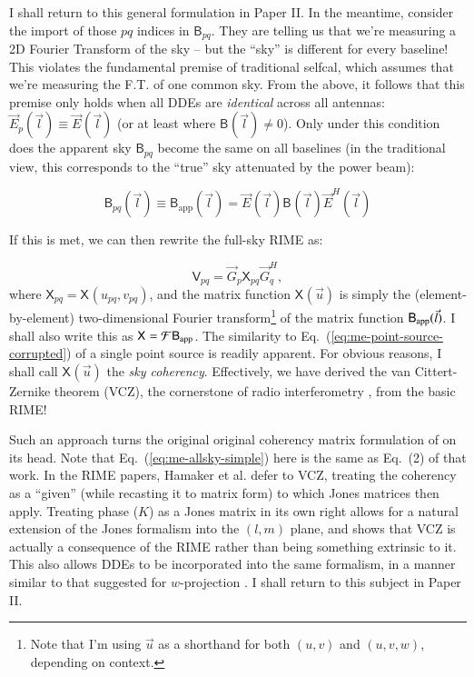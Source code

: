 \documentclass[referee]{aa}
\newcommand{\herm}{H}
\newcommand{\jones}[2]{\vec {#1}_{#2}}
\newcommand{\jonesT}[2]{\vec {#1}^{\herm}_{#2}}
\newcommand{\coh}[2]{\mathsf{{#1}}_{{#2}}}
\begin{document}
I shall return to this general formulation in Paper II. In the meantime, consider the import of those $pq$ indices in $\coh{B}{pq}$. They are telling us that we're measuring a 2D Fourier Transform of the sky -- but the ``sky'' is different for every baseline! This violates the fundamental premise of traditional selfcal, which assumes that we're measuring the F.T. of one common sky. From the above, it follows that this premise only holds when all DDEs are \emph{identical} across all antennas: $\jones{E}{p}(\vec l) \equiv \jones{E}{}(\vec l)$ (or at least where $\coh{B}{}(\vec l) \ne 0$). Only under this condition does the apparent sky $\coh{B}{pq}$ become the same on all baselines (in the traditional view, this corresponds to the ``true'' sky attenuated by the power beam):

\[
\coh{B}{pq}(\vec l) \equiv \coh{B}{\mathrm{app}}(\vec l) =  \jones{E}{}(\vec l) \coh{B}{}(\vec l) \jonesT{E}{}(\vec l)
\]

If this is met, we can then rewrite the full-sky RIME as:

\begin{equation}\label{eq:me-allsky-simple}
\coh{V}{pq} = \jones{G}{p} \coh{X}{pq} \jonesT{G}{q},
\end{equation}
where $\coh{X}{pq} = \coh{X}{}(u_{pq},v_{pq})$, and the matrix function $\coh{X}{}(\vec u)$ is simply the (element-by-element) two-dimensional Fourier transform\footnote{Note that I'm using $\vec u$ as a shorthand for both $(u,v)$ and $(u,v,w)$, depending on context.}
of the matrix function $\coh{B}{\rm app}(\vec l)$. I shall also write this as $\coh{X}{}={\cal F}\coh{B}{\mathrm{app}}$. The similarity to Eq.~(\ref{eq:me-point-source-corrupted}) of a single point source is readily apparent. For obvious reasons, I shall call $\coh{X}{}(\vec u)$ the {\em sky coherency}. Effectively, we have derived the van Cittert-Zernike theorem (VCZ), the cornerstone of radio interferometry \citep[Sect.~14.1]{tms}, from the basic RIME! 

Such an approach turns the original original coherency matrix formulation of \citet{ME4} on its head. Note that Eq.~(\ref{eq:me-allsky-simple}) here is the same as Eq.~(2) of that work. In the RIME papers, Hamaker et al. defer to VCZ, treating the coherency as a ``given'' (while recasting it to matrix form) to which Jones matrices then apply. Treating phase ($K$) as a Jones matrix in its own right \citep{JEN:note185} allows for a natural extension of the Jones formalism into the $(l,m)$ plane, and shows that VCZ is actually a consequence of the RIME rather than being something extrinsic to it. This also allows DDEs to be incorporated into the same formalism, in a manner similar to that suggested for $w$-projection \citep{Cornwell:wproj}. I shall return to this subject in Paper II.
\end{document}
